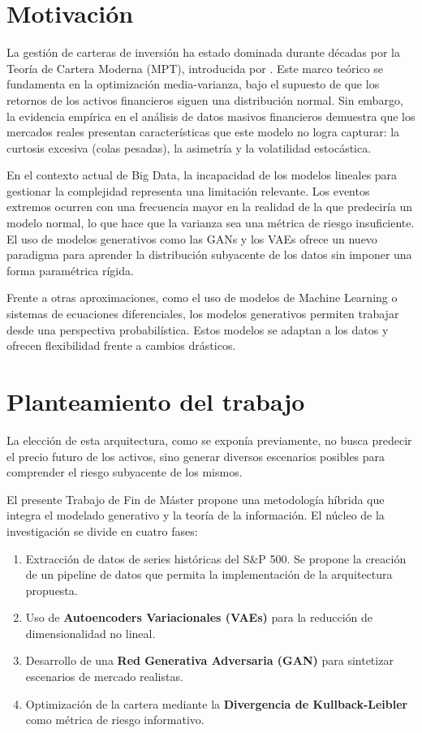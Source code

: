 \section{Motivación}

La gestión de carteras de inversión ha estado dominada durante décadas por la Teoría de Cartera Moderna (MPT), introducida por \cite{markowitz1952}. Este marco teórico se fundamenta en la optimización media-varianza, bajo el supuesto de que los retornos de los activos financieros siguen una distribución normal. Sin embargo, la evidencia empírica en el análisis de datos masivos financieros demuestra que los mercados reales presentan características que este modelo no logra capturar: la curtosis excesiva (colas pesadas), la asimetría y la volatilidad estocástica.

En el contexto actual de Big Data, la incapacidad de los modelos lineales para gestionar la complejidad representa una limitación relevante. Los eventos extremos ocurren con una frecuencia mayor en la realidad de la que predeciría un modelo normal, lo que hace que la varianza sea una métrica de riesgo insuficiente. El uso de modelos generativos como las GANs \cite{NIPS2016_8a3363ab} y los VAEs \cite{kingma2013auto} ofrece un nuevo paradigma para aprender la distribución subyacente de los datos sin imponer una forma paramétrica rígida.

Frente a otras aproximaciones, como el uso de modelos de Machine Learning o sistemas de ecuaciones diferenciales, los modelos generativos permiten trabajar desde una perspectiva probabilística. Estos modelos se adaptan a los datos y ofrecen flexibilidad frente a cambios drásticos.

\section{Planteamiento del trabajo}

La elección de esta arquitectura, como se exponía previamente, no busca predecir el precio futuro de los activos, sino generar diversos escenarios posibles para comprender el riesgo subyacente de los mismos.

El presente Trabajo de Fin de Máster propone una metodología híbrida que integra el modelado generativo y la teoría de la información. El núcleo de la investigación se divide en cuatro fases:

\begin{enumerate}
\item Extracción de datos de series históricas del S\&P 500. Se propone la creación de un pipeline de datos que permita la implementación de la arquitectura propuesta.
\item Uso de \textbf{Autoencoders Variacionales (VAEs)} para la reducción de dimensionalidad no lineal.
\item Desarrollo de una \textbf{Red Generativa Adversaria (GAN)} para sintetizar escenarios de mercado realistas.
\item Optimización de la cartera mediante la \textbf{Divergencia de Kullback-Leibler} como métrica de riesgo informativo.
\end{enumerate}

